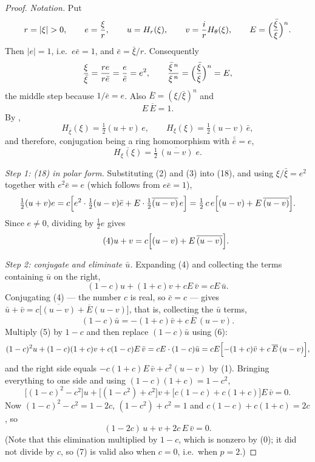 \begin{proof}
\emph{Notation.}  Put
\[
  r=|\xi|>0,\qquad e=\frac{\xi}{r},\qquad
  u=H_r(\xi),\qquad v=\frac ir H_\theta(\xi),\qquad E=\Bigl(\frac{\bar\xi}{\xi}\Bigr)^{n}.
\]
Then $|e|=1$, i.e.\ $e\bar e=1$, and $\bar e=\bar\xi/r$.  Consequently
\[
  \frac{\xi}{\bar\xi}=\frac{re}{r\bar e}=\frac{e}{\bar e}=e^{2},
  \qquad
  \frac{\bar\xi^{\,n}}{\xi^{\,n}}=\Bigl(\frac{\bar\xi}{\xi}\Bigr)^{n}=E,
\]
the middle step because $1/\bar e=e$.  Also $\overline{E}=(\xi/\bar\xi)^{n}$
and
\begin{equation}\tag{1}
  E\,\overline{E}=1 .
\end{equation}
By ,
\begin{equation}\tag{2}
  H_{\bar\xi}(\xi)=\tfrac12(u+v)\,e,\qquad H_\xi(\xi)=\tfrac12(u-v)\,\bar e,
\end{equation}
and therefore, conjugation being a ring homomorphism with $\bar{\bar e}=e$,
\begin{equation}\tag{3}
  \overline{H_\xi(\xi)}=\tfrac12\,\overline{(u-v)}\;e .
\end{equation}

\emph{Step 1: (18) in polar form.}  Substituting (2) and (3) into (18), and
using $\xi/\bar\xi=e^{2}$ together with $e^{2}\bar e=e$ (which follows from
$e\bar e=1$),
\[
  \tfrac12(u+v)e
  =c\Bigl[e^{2}\cdot\tfrac12(u-v)\bar e+E\cdot\tfrac12\overline{(u-v)}\,e\Bigr]
  =\tfrac12\,c\,e\Bigl[(u-v)+E\,\overline{(u-v)}\Bigr].
\]
Since $e\neq0$, dividing by $\tfrac12 e$ gives
\begin{equation}\tag{4}
  u+v=c\Bigl[(u-v)+E\,\overline{(u-v)}\Bigr].
\end{equation}

\emph{Step 2: conjugate and eliminate $\bar u$.}  Expanding (4) and collecting
the terms containing $\bar u$ on the right,
\begin{equation}\tag{5}
  (1-c)u+(1+c)v+cE\,\bar v=cE\,\bar u .
\end{equation}
Conjugating (4) — the number $c$ is real, so $\bar c=c$ — gives
$\bar u+\bar v=c\bigl[\overline{(u-v)}+\overline{E}(u-v)\bigr]$, that is,
collecting the $\bar u$ terms,
\begin{equation}\tag{6}
  (1-c)\bar u=-(1+c)\bar v+c\,\overline{E}\,(u-v).
\end{equation}
Multiply (5) by $1-c$ and then replace $(1-c)\bar u$ using (6):
\[
  (1-c)^2u+(1-c)(1+c)v+c(1-c)E\,\bar v
  =cE\cdot(1-c)\bar u
  =cE\Bigl[-(1+c)\bar v+c\,\overline{E}\,(u-v)\Bigr],
\]
and the right side equals $-c(1+c)E\,\bar v+c^{2}(u-v)$ by (1).  Bringing
everything to one side and using $(1-c)(1+c)=1-c^{2}$,
\[
  \bigl[(1-c)^2-c^2\bigr]u+\bigl[(1-c^{2})+c^{2}\bigr]v
    +\bigl[c(1-c)+c(1+c)\bigr]E\,\bar v=0 .
\]
Now $(1-c)^2-c^2=1-2c$, $(1-c^{2})+c^{2}=1$ and
$c(1-c)+c(1+c)=2c$, so
\begin{equation}\tag{7}
  (1-2c)\,u+v+2c\,E\,\bar v=0 .
\end{equation}
(Note that this elimination multiplied by $1-c$, which is nonzero by (0); it
did not divide by $c$, so (7) is valid also when $c=0$, i.e.\ when $p=2$.)


\end{proof}
